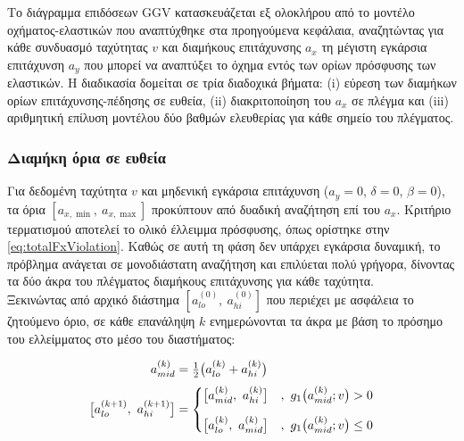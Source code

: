 \label{subsec:ggv}

Το διάγραμμα επιδόσεων GGV κατασκευάζεται εξ ολοκλήρου από το μοντέλο οχήματος-ελαστικών
που αναπτύχθηκε στα προηγούμενα κεφάλαια, αναζητώντας για κάθε συνδυασμό ταχύτητας $v$ και
διαμήκους επιτάχυνσης $a_x$ τη μέγιστη εγκάρσια επιτάχυνση $a_y$ που μπορεί να αναπτύξει
το όχημα εντός των ορίων πρόσφυσης των ελαστικών. Η διαδικασία δομείται σε τρία διαδοχικά
βήματα: (i) εύρεση των διαμήκων ορίων επιτάχυνσης-πέδησης σε ευθεία, (ii) διακριτοποίηση
του $a_x$ σε πλέγμα και (iii) αριθμητική επίλυση μοντέλου δύο βαθμών ελευθερίας για κάθε
σημείο του πλέγματος.\\[10pt]


\subsubsection{Διαμήκη όρια σε ευθεία}

Για δεδομένη ταχύτητα $v$ και μηδενική εγκάρσια επιτάχυνση ($a_y = 0$, $\delta = 0$,
$\beta = 0$), τα όρια $[a_{x,\min},\ a_{x,\max}]$ προκύπτουν από δυαδική αναζήτηση επί
του $a_x$. Κριτήριο τερματισμού αποτελεί το ολικό έλλειμμα πρόσφυσης, όπως ορίστηκε στην
\cref{eq:totalFxViolation}. Καθώς σε αυτή τη φάση δεν υπάρχει εγκάρσια δυναμική, το
πρόβλημα ανάγεται σε μονοδιάστατη αναζήτηση και επιλύεται πολύ γρήγορα, δίνοντας τα δύο
άκρα του πλέγματος διαμήκους επιτάχυνσης για κάθε ταχύτητα.\\[10pt]

Ξεκινώντας από αρχικό διάστημα $[a_{lo}^{(0)},\ a_{hi}^{(0)}]$ που περιέχει με ασφάλεια
το ζητούμενο όριο, σε κάθε επανάληψη $k$ ενημερώνονται τα άκρα με βάση το πρόσημο του
ελλείμματος στο μέσο του διαστήματος:

\begin{equation}
    \begin{aligned}
        a_{mid}^{(k)} &= \tfrac{1}{2}\bigl(a_{lo}^{(k)} + a_{hi}^{(k)}\bigr) \\[3pt]
        \bigl[a_{lo}^{(k+1)},\ a_{hi}^{(k+1)}\bigr] &=
        \begin{dcases}
            \bigl[a_{mid}^{(k)},\ a_{hi}^{(k)}\bigr] &,\ g_1\bigl(a_{mid}^{(k)}; v\bigr) > 0 \\[6pt]
            \bigl[a_{lo}^{(k)},\ a_{mid}^{(k)}\bigr] &,\ g_1\bigl(a_{mid}^{(k)}; v\bigr) \leq 0
        \end{dcases}
    \end{aligned}
    \label{eq:ggvBinarySearch}
\end{equation}

